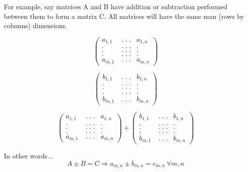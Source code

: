 For example, say matrices A and B have addition or subtraction performed between them to form a matrix C. All matrices will have the same mxn (rows by columns) dimensions.

\begin{equation}
	\begin{pmatrix}
		a_{1, 1} &\; .\; .\; . & a_{1, n} \\
		.        &\; .\; .\; . & .        \\
		.        &\; .\; .\; . & .        \\
		.        & \; .\; .\; . & .        \\
		a_{m, 1} & \; .\; .\; . & a_{m, n}
	\end{pmatrix}
\end{equation}

\begin{equation}
	\begin{pmatrix}
		b_{1, 1} &\; .\; .\; . & b_{1, n} \\
		.        &\; .\; .\; . & .        \\
		.        &\; .\; .\; . & .        \\
		.        & \; .\; .\; . & .        \\
		b_{m, 1} & \; .\; .\; . & b_{m, n}
	\end{pmatrix}
\end{equation}

\begin{equation}
	\begin{pmatrix}
		a_{1, 1} &\; .\; .\; . & a_{1, n} \\
		.        &\; .\; .\; . & .        \\
		.        &\; .\; .\; . & .        \\
		.        & \; .\; .\; . & .        \\
		a_{m, 1} & \; .\; .\; . & a_{m, n}
	\end{pmatrix}
	+
	\begin{pmatrix}
		b_{1, 1} &\; .\; .\; . & b_{1, n} \\
		.        &\; .\; .\; . & .        \\
		.        &\; .\; .\; . & .        \\
		.        & \; .\; .\; . & .        \\
		b_{m, 1} & \; .\; .\; . & b_{m, n}
	\end{pmatrix}
\end{equation}


In other words...
\begin{equation}
	A \pm B = C \Longrightarrow a_{m, n} \pm b_{m, n} = c_{m, n} \: \forall m, n
\end{equation}

